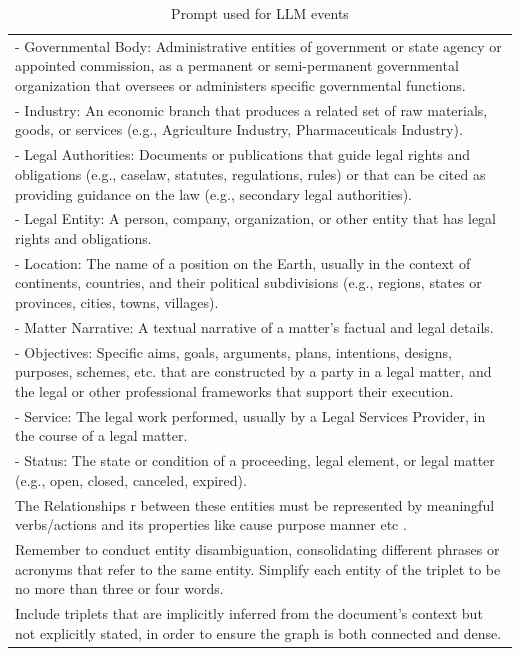 \begin{table}
\begin{tabular}{|p{}|}
\\
- Governmental Body: Administrative entities of government or state agency or appointed commission, as a permanent or semi-permanent governmental organization that oversees or administers specific governmental functions.
\\
- Industry: An economic branch that produces a related set of raw materials, goods, or services (e.g., Agriculture Industry, Pharmaceuticals Industry).
\\
- Legal Authorities: Documents or publications that guide legal rights and obligations (e.g., caselaw, statutes, regulations, rules) or that can be cited as providing guidance on the law (e.g., secondary legal authorities).
\\
- Legal Entity: A person, company, organization, or other entity that has legal rights and obligations.
\\
- Location: The name of a position on the Earth, usually in the context of continents, countries, and their political subdivisions (e.g., regions, states or provinces, cities, towns, villages).
\\
- Matter Narrative: A textual narrative of a matter's factual and legal details.
\\
- Objectives: Specific aims, goals, arguments, plans, intentions, designs, purposes, schemes, etc. that are constructed by a party in a legal matter, and the legal or other professional frameworks that support their execution.
\\
- Service: The legal work performed, usually by a Legal Services Provider, in the course of a legal matter.
\\
- Status: The state or condition of a proceeding, legal element, or legal matter (e.g., open, closed, canceled, expired).
\\
The Relationships r between these entities must be represented by meaningful verbs/actions and its  properties  like cause purpose manner etc .
\\
Remember to conduct entity disambiguation, consolidating different phrases or acronyms that refer to the same entity.
Simplify each entity of the triplet to be no more than three or four words.
\\
Include triplets that are implicitly inferred from the document's context but not explicitly stated, in order to ensure the graph is both connected and dense. \\ \hline     
    \end{tabular}
    \caption{Prompt used for LLM events}
    \label{tab:event-llm-prompt}
\end{table}

